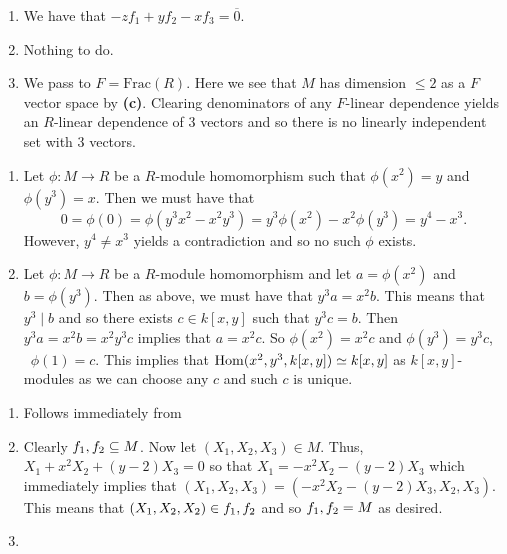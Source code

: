 \documentclass[letterpaper, 11pt, oneside]{book}
\begin{document}
\begin{sol}
\begin{enumerate}
          \clearpage

    \item We have that $-z f_{1} + y f_{2} - x f_{3} = \overline{0}$.
    \item Nothing to do.
    \item We pass to $F = \mathrm{Frac}(R)$.
          Here we see that $M$ has dimension $\leq 2$ as a $F$ vector space by \textbf{(c)}.
          Clearing denominators of any $F$-linear dependence yields an $R$-linear dependence of 3 vectors and so there is no linearly independent set with 3 vectors.
  \end{enumerate}
\end{sol}

\begin{sol}\label{ex:UAG_5.1.8}
  \begin{enumerate}
    \item Let $\phi\colon M \to R$ be a $R$-module homomorphism such that $\phi(x^{2}) = y$ and $\phi(y^{3}) = x$.
          Then we must have that
          \[
            0 = \phi(0) = \phi(y^{3}x^{2} - x^{2}y^{3}) = y^{3} \phi(x^{2}) - x^{2} \phi(y^{3}) = y^{4} - x^{3}.
          \]
          However, $y^{4} \neq x^{3}$ yields a contradiction and so no such $\phi$ exists.
    \item Let $\phi\colon M \to R$ be a $R$-module homomorphism and let $a = \phi(x^{2})$ and $b = \phi(y^{3})$.
          Then as above, we must have that $y^{3}a = x^{2} b$.
          This means that $y^{3} \mid b$ and so there exists $c \in k[x, y]$ such that $y^{3} c = b$.
          Then $y^{3} a = x^{2} b = x^{2} y^{3} c$ implies that $a = x^{2} c$.
          So $\phi(x^{2}) = x^{2} c$ and $\phi(y^{3}) = y^{3} c$, \ie\ $\phi(1) = c$.
          This implies that $\Hom(\gen{x^{2}, y^{3}}, k[x, y]) \simeq k[x, y]$ as $k[x, y]$-modules as we can choose any $c$ and such $c$ is unique.
  \end{enumerate}
\end{sol}

\begin{sol}\label{ex:UAG_5.1.9}
  \begin{enumerate}
    \item Follows immediately from 
    \item Clearly $\gen{f_{1}, f_{2}} \subseteq M$.
          Now let $(X_{1}, X_{2}, X_{3}) \in M$.
          Thus, $X_{1} + x^{2}X_{2} + (y - 2)X_{3} = 0$ so that $X_{1} = -x^{2}X_{2} - (y - 2)X_{3}$ which immediately implies that $(X_{1}, X_{2}, X_{3}) = (-x^{2}X_{2} - (y - 2)X_{3}, X_{2}, X_{3})$.
          This means that $(X_{1}, X_{2}, X_{2}) \in \gen{f_{1}, f_{2}}$ and so $\gen{f_{1}, f_{2}} = M$ as desired.
    \item {}
  \end{enumerate}
\end{sol}
\end{document}
